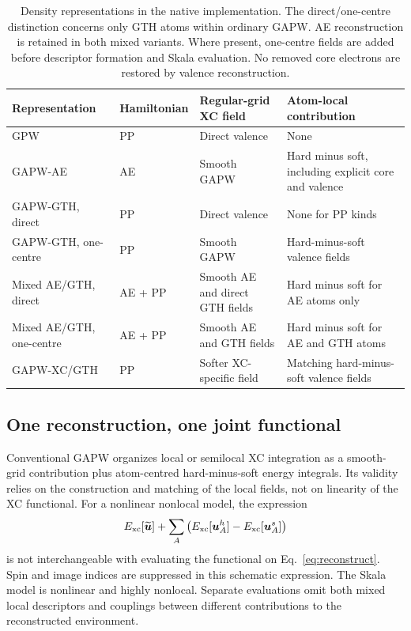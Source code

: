 \documentclass[10pt,a4paper,twocolumn]{article}
\newcommand{\uvec}{\boldsymbol{u}}
\begin{document}
\begin{table}[t]
\centering\small
\caption{Density representations in the native implementation. The direct/one-centre distinction concerns only GTH atoms within ordinary GAPW. AE reconstruction is retained in both mixed variants. Where present, one-centre fields are added before descriptor formation and Skala evaluation. No removed core electrons are restored by valence reconstruction.}
\label{tab:representations}
\vspace{3pt}
\begin{tabular}{@{}>{\raggedright\arraybackslash}p{}>{\raggedright\arraybackslash}p{}>{\raggedright\arraybackslash}p{}>{\raggedright\arraybackslash}p{}@{}}
\toprule
Representation & Hamiltonian & Regular-grid XC field & Atom-local contribution\\
\midrule
GPW & PP & Direct valence & None\\
GAPW-AE & AE & Smooth GAPW & Hard minus soft, including explicit core and valence\\
GAPW-GTH, direct & PP & Direct valence & None for PP kinds\\
GAPW-GTH, one-centre & PP & Smooth GAPW & Hard-minus-soft valence fields\\
Mixed AE/GTH, direct & AE + PP & Smooth AE and direct GTH fields & Hard minus soft for AE atoms only\\
Mixed AE/GTH, one-centre & AE + PP & Smooth AE and GTH fields & Hard minus soft for AE and GTH atoms\\
GAPW-XC/GTH & PP & Softer XC-specific field & Matching hard-minus-soft valence fields\\
\bottomrule
\end{tabular}
\end{table}

\subsection{One reconstruction, one joint functional}
\label{sec:joint-functional}

Conventional GAPW organizes local or semilocal XC integration as a smooth-grid contribution plus atom-centred hard-minus-soft energy integrals. Its validity relies on the construction and matching of the local fields, not on linearity of the XC functional. For a nonlinear nonlocal model, the expression
\begin{equation}
 E_{\rm xc}[\widetilde{\uvec}]+\sum_A
 \big(E_{\rm xc}[\uvec^h_A]-E_{\rm xc}[\uvec^s_A]\big)
 \label{eq:wrong}
\end{equation}
is not interchangeable with evaluating the functional on Eq.~\eqref{eq:reconstruct}. Spin and image indices are suppressed in this schematic expression. The Skala model is nonlinear and highly nonlocal. Separate evaluations omit both mixed local descriptors and couplings between different contributions to the reconstructed environment.
\end{document}
